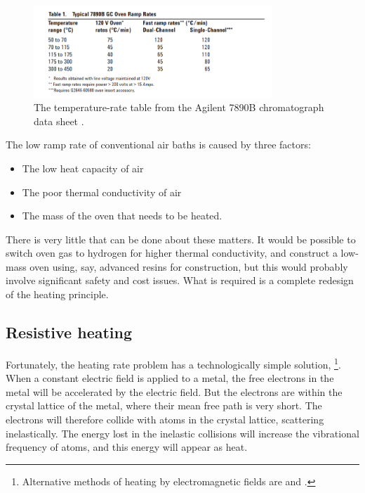 \begin{figure}
	\centering
	\includegraphics[width=0.8\textwidth]{Figures/7890B.png}
	\decoRule
	\caption[A temperature-rate table from the Agilent7890B data sheet]{The
	temperature-rate table from the Agilent 7890B chromatograph data sheet
	\autocite{7890B}. }
	\label{fig:RampRate7890B}
\end{figure}

The low ramp rate of conventional air baths is caused by three factors:

\begin{itemize}
	\item The low heat capacity of air
	\item The poor thermal conductivity of air
	\item The mass of the oven that needs to be heated. 
\end{itemize}

There is very little that can be done about these matters. It would be possible
to switch oven gas to hydrogen for higher thermal conductivity, and construct a
low-mass oven using, say, advanced resins for construction, but this would
probably involve significant safety and cost issues. What is required is a
complete redesign of the heating principle.

\subsection{Resistive heating}

Fortunately, the heating rate problem has a technologically simple solution,
\footnote{Alternative methods of heating by
electromagnetic fields are  and .}. When a constant electric field is applied to a metal, the free electrons in
the metal will be accelerated by the electric field. But the electrons are
within the crystal lattice of the metal, where their mean free path is very
short. The electrons will therefore collide with atoms in the crystal lattice,
scattering inelastically. The energy lost in the inelastic collisions will
increase the vibrational frequency of atoms, and this energy will appear as
heat.

